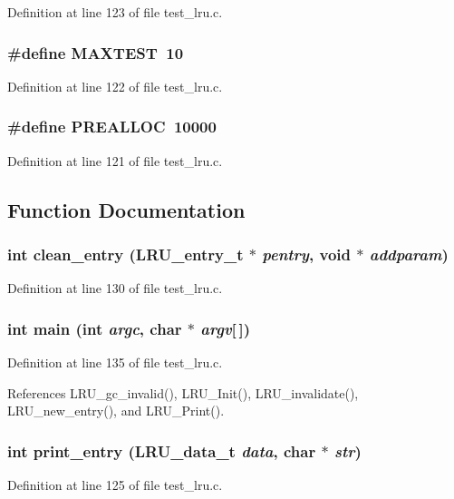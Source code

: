 Definition at line 123 of file test\_\-lru.c.
\subsubsection{\setlength{\rightskip}{0pt plus 5cm}\#define MAXTEST\ 10}\label{test__lru_8c_a1}




Definition at line 122 of file test\_\-lru.c.
\subsubsection{\setlength{\rightskip}{0pt plus 5cm}\#define PREALLOC\ 10000}\label{test__lru_8c_a0}




Definition at line 121 of file test\_\-lru.c.

\subsection{Function Documentation}
\subsubsection{\setlength{\rightskip}{0pt plus 5cm}int clean\_\-entry (LRU\_\-entry\_\-t $\ast$ {\em pentry}, void $\ast$ {\em addparam})}\label{test__lru_8c_a4}




Definition at line 130 of file test\_\-lru.c.
\subsubsection{\setlength{\rightskip}{0pt plus 5cm}int main (int {\em argc}, char $\ast$ {\em argv}[$\,$])}\label{test__lru_8c_a5}




Definition at line 135 of file test\_\-lru.c.

References LRU\_\-gc\_\-invalid(), LRU\_\-Init(), LRU\_\-invalidate(), LRU\_\-new\_\-entry(), and LRU\_\-Print().
\subsubsection{\setlength{\rightskip}{0pt plus 5cm}int print\_\-entry (LRU\_\-data\_\-t {\em data}, char $\ast$ {\em str})}\label{test__lru_8c_a3}




Definition at line 125 of file test\_\-lru.c.